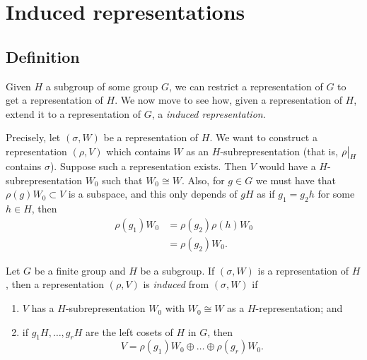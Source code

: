 \section{Induced representations}

\subsection{Definition}

Given $H$ a subgroup of some group $G$, we can restrict a representation of $G$ to get a representation of $H$. We now move to see how, given a representation of $H$, extend it to a representation of $G$, a \emph{induced representation}.

Precisely, let $(\sigma, W)$ be a representation of $H$. We want to construct a representation $(\rho, V)$ which contains $W$ as an $H$-subrepresentation (that is, $\restr{\rho}{H}$ contains $\sigma$). Suppose such a representation exists. Then $V$ would have a $H$-subrepresentation $W_0$ such that $W_0 \cong W$. Also, for $g \in G$ we must have that $\rho(g) W_0 \subset V$ is a subspace, and this only depends of $gH$ as if $g_1 = g_2h$ for some $h \in H$, then
\begin{align*}
    \rho(g_1)W_0 & = \rho(g_2) \rho(h) W_0 \\
                 & = \rho(g_2) W_0.
\end{align*}

\begin{definition}
    Let $G$ be a finite group and $H$ be a subgroup. If $(\sigma, W)$ is a representation of $H$, then a representation $(\rho, V)$ is \emph{induced} from $(\sigma, W)$ if
    \begin{enumerate}
        \item $V$ has a $H$-subrepresentation $W_0$ with $W_0 \cong W$ as a $H$-representation; and
        \item if $g_1H, \ldots, g_rH$ are the left cosets of $H$ in $G$, then
              \[ V = \rho(g_1)W_0 \oplus \ldots \oplus \rho(g_r)W_0. \]
    \end{enumerate}
\end{definition}


